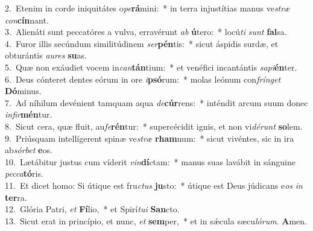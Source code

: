 {2.~}Etenim in corde iniquitátes o\textit{pe}\textbf{rá}mini:~* in terra injustítias manus ve\textit{stræ} \textit{con}\textbf{cín}nant.\\
{3.~}Alienáti sunt peccatóres a vulva, erravérunt \textit{ab} \textbf{ú}tero:~* locú\textit{ti} \textit{sunt} \textbf{fal}sa.\\
{4.~}Furor illis secúndum similitúdinem \textit{ser}\textbf{pén}tis:~* sicut áspidis surdæ, et obturántis \textit{au}\textit{res} \textbf{su}as.\\
{5.~}Quæ non exáudiet vocem in\textit{can}\textbf{tán}tium:~* et venéfici incantántis \textit{sa}\textit{pi}\textbf{én}ter.\\
{6.~}Deus cónteret dentes eórum in ore \textit{i}\textbf{psó}rum:~* molas leónum con\textit{frín}\textit{get} \textbf{Dó}minus.\\
{7.~}Ad níhilum devénient tamquam aqua \textit{de}\textbf{cúr}rens:~* inténdit arcum suum donec \textit{in}\textit{fir}\textbf{mén}tur.\\
{8.~}Sicut cera, quæ fluit, au\textit{fe}\textbf{rén}tur:~* supercécidit ignis, et non vi\textit{dé}\textit{runt} \textbf{so}lem.\\
{9.~}Priúsquam intellígerent spinæ ve\textit{stræ} \textbf{rham}num:~* sicut vivéntes, sic in ira ab\textit{sór}\textit{bet} \textbf{e}os.\\
{10.~}Lætábitur justus cum víderit \textit{vin}\textbf{dí}ctam:~* manus suas lavábit in sánguine \textit{pec}\textit{ca}\textbf{tó}ris.\\
{11.~}Et dicet homo: Si útique est fru\textit{ctus} \textbf{ju}sto:~* útique est Deus júdicans e\textit{os} \textit{in} \textbf{ter}ra.\\
{12.~}Glória Patri, \textit{et} \textbf{Fí}lio,~* et Spirí\textit{tu}\textit{i} \textbf{San}cto.\\
{13.~}Sicut erat in princípio, et nunc, \textit{et} \textbf{sem}per,~* et in sǽcula sæcu\textit{ló}\textit{rum}. \textbf{A}men.\\
